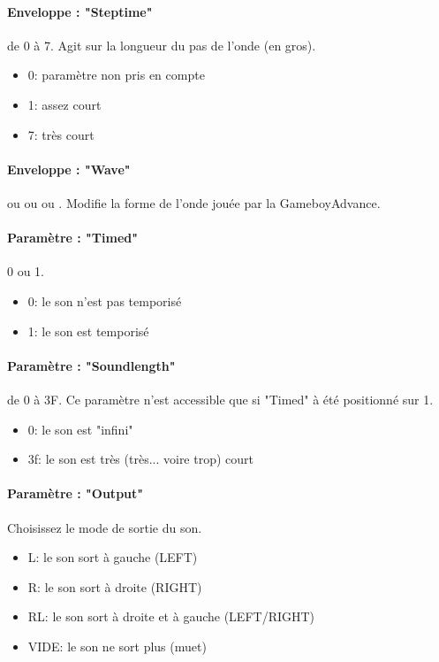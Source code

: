 \documentclass[12pt,a4paper]{article}
\begin{document}
            \paragraph{Enveloppe : "Steptime"} de 0 à 7. Agit sur la longueur du pas de l'onde (en gros). 
            \begin{itemize}
                \item{0: paramètre non pris en compte}
                \item{1: assez court}
                \item{7: très court}
            \end{itemize}
            
            \paragraph{Enveloppe : "Wave"}  ou  ou  ou . Modifie la forme de l'onde jouée par la GameboyAdvance.
            
            \paragraph{Paramètre : "Timed"} 0 ou 1.
            \begin{itemize}
                \item{0: le son n'est pas temporisé}
                \item{1: le son est temporisé}
            \end{itemize}
            
            \paragraph{Paramètre : "Soundlength"} de 0 à 3F. Ce paramètre n'est accessible que si "Timed" à été positionné sur 1.
            \begin{itemize}
                \item{0: le son est "infini"}
                \item{3f: le son est très (très... voire trop) court}
            \end{itemize}
            
            \paragraph{Paramètre : "Output"} Choisissez le mode de sortie du son.
            \begin{itemize}
                \item{L: le son sort à gauche (LEFT)}
                \item{R: le son sort à droite (RIGHT)}
                \item{RL: le son sort à droite et à gauche (LEFT/RIGHT)}
                \item{VIDE: le son ne sort plus (muet)}
            \end{itemize}
            
\end{document}
